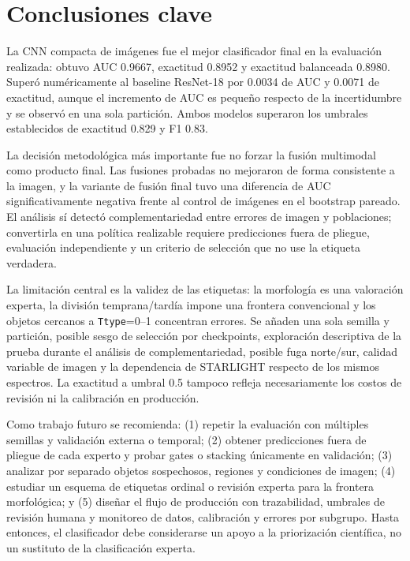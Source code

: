 \documentclass[letterpaper,11pt]{article}
\begin{document}
\section{Conclusiones clave}

La CNN compacta de imágenes fue el mejor clasificador final en la evaluación realizada: obtuvo AUC 0.9667, exactitud 0.8952 y exactitud balanceada 0.8980. Superó numéricamente al baseline ResNet-18 por 0.0034 de AUC y 0.0071 de exactitud, aunque el incremento de AUC es pequeño respecto de la incertidumbre y se observó en una sola partición. Ambos modelos superaron los umbrales establecidos de exactitud 0.829 y F1 0.83.

La decisión metodológica más importante fue no forzar la fusión multimodal como producto final. Las fusiones probadas no mejoraron de forma consistente a la imagen, y la variante de fusión final tuvo una diferencia de AUC significativamente negativa frente al control de imágenes en el bootstrap pareado. El análisis sí detectó complementariedad entre errores de imagen y poblaciones; convertirla en una política realizable requiere predicciones fuera de pliegue, evaluación independiente y un criterio de selección que no use la etiqueta verdadera.

La limitación central es la validez de las etiquetas: la morfología es una valoración experta, la división temprana/tardía impone una frontera convencional y los objetos cercanos a \texttt{Ttype}=0--1 concentran errores. Se añaden una sola semilla y partición, posible sesgo de selección por checkpoints, exploración descriptiva de la prueba durante el análisis de complementariedad, posible fuga norte/sur, calidad variable de imagen y la dependencia de STARLIGHT respecto de los mismos espectros. La exactitud a umbral 0.5 tampoco refleja necesariamente los costos de revisión ni la calibración en producción.

Como trabajo futuro se recomienda: (1) repetir la evaluación con múltiples semillas y validación externa o temporal; (2) obtener predicciones fuera de pliegue de cada experto y probar gates o stacking únicamente en validación; (3) analizar por separado objetos sospechosos, regiones y condiciones de imagen; (4) estudiar un esquema de etiquetas ordinal o revisión experta para la frontera morfológica; y (5) diseñar el flujo de producción con trazabilidad, umbrales de revisión humana y monitoreo de datos, calibración y errores por subgrupo. Hasta entonces, el clasificador debe considerarse un apoyo a la priorización científica, no un sustituto de la clasificación experta.
\end{document}
